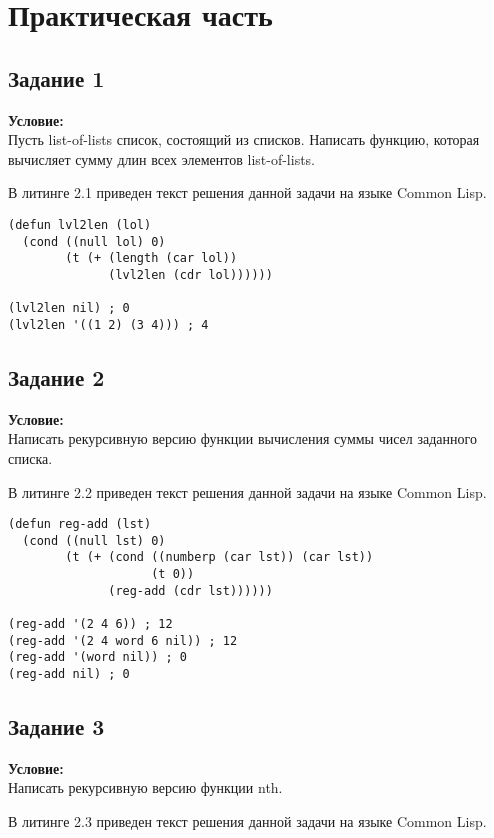 \chapter{Практическая часть}

\lstset{language=lisp}

\section{Задание \No{}1}
\textbf{Условие:}\\Пусть list-of-lists список, состоящий из списков. Написать функцию, которая вычисляет сумму длин всех элементов list-of-lists.

В литинге 2.1 приведен текст решения данной задачи на языке Common Lisp.

\begin{lstlisting}[caption={Задание \No{}1}]
(defun lvl2len (lol)
  (cond ((null lol) 0)
        (t (+ (length (car lol))
              (lvl2len (cdr lol))))))

(lvl2len nil) ; 0
(lvl2len '((1 2) (3 4))) ; 4
\end{lstlisting}

\section{Задание \No{}2}
\textbf{Условие:}\\Написать рекурсивную версию функции вычисления суммы чисел заданного списка.

В литинге 2.2 приведен текст решения данной задачи на языке Common Lisp.

\begin{lstlisting}[caption={Задание \No{}2}]
(defun reg-add (lst)
  (cond ((null lst) 0)
        (t (+ (cond ((numberp (car lst)) (car lst))
                    (t 0))
              (reg-add (cdr lst))))))

(reg-add '(2 4 6)) ; 12
(reg-add '(2 4 word 6 nil)) ; 12
(reg-add '(word nil)) ; 0
(reg-add nil) ; 0
\end{lstlisting}

\section{Задание \No{}3}
\textbf{Условие:}\\Написать рекурсивную версию функции nth.

В литинге 2.3 приведен текст решения данной задачи на языке Common Lisp.


